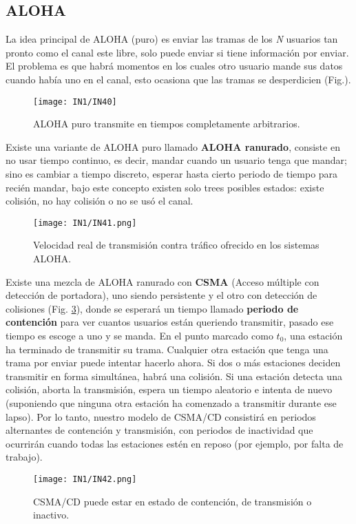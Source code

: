 \documentclass[
	12pt, %
	fleqn, %
	a4paper, %
]{LegrandOrangeBook}
\begin{document}
\subsection{ALOHA}
La idea principal de ALOHA (puro) es enviar las tramas de los \textit{N} usuarios tan pronto como el canal este libre, solo puede enviar si tiene información por enviar. El problema es que habrá momentos en los cuales otro usuario mande sus datos cuando había uno en el canal, esto ocasiona que las tramas se desperdicien (Fig.).
\begin{figure}[]
\centering
\texttt{[image: IN1/IN40]}
\caption{ALOHA puro transmite en tiempos completamente arbitrarios.}
\label{fig:ALOHA puro}
\end{figure}
Existe una variante de ALOHA puro llamado \textbf{ALOHA ranurado}, consiste en no usar tiempo continuo, es decir, mandar cuando un usuario tenga que mandar; sino es cambiar a tiempo discreto, esperar hasta cierto periodo de tiempo para recién mandar, bajo este concepto existen solo trees posibles estados: existe colisión, no hay colisión o no se usó el canal.
\begin{figure}[]
\centering
\texttt{[image: IN1/IN41.png]}
\caption{Velocidad real de transmisión contra tráfico ofrecido en los sistemas ALOHA.}
\label{fig:Velocidad de alohas}
\end{figure}
Existe una mezcla de ALOHA ranurado con \textbf{CSMA}   (Acceso múltiple con detección de portadora), uno siendo persistente y el otro con detección de colisiones (Fig. \ref{fig:CSMA CD}), donde se esperará un tiempo llamado \textbf{periodo de contención} para ver cuantos usuarios están queriendo transmitir, pasado ese tiempo es escoge a uno y se manda. En el punto marcado como $t_0$, una estación ha terminado de transmitir su trama. Cualquier otra estación que tenga una trama por enviar puede intentar hacerlo ahora. Si dos o más estaciones deciden transmitir en forma simultánea, habrá una colisión. Si una estación detecta una colisión, aborta la transmisión, espera un tiempo aleatorio e intenta de nuevo (suponiendo que ninguna otra estación ha comenzado a transmitir durante ese lapso). Por lo tanto, nuestro modelo de CSMA/CD consistirá en periodos alternantes de contención y transmisión, con periodos de inactividad que ocurrirán cuando todas las estaciones estén en reposo (por ejemplo, por falta de trabajo).
\begin{figure}[]
\centering
\texttt{[image: IN1/IN42.png]}
\caption{CSMA/CD puede estar en estado de contención, de transmisión o inactivo.}
\label{fig:CSMA CD}
\end{figure}
\end{document}
